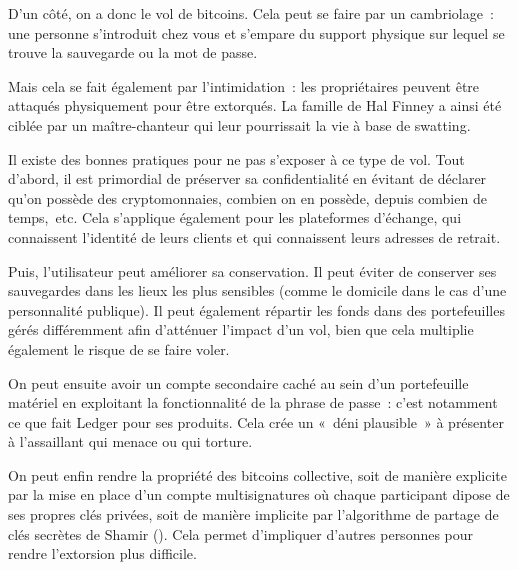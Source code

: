 D'un côté, on a donc le vol de bitcoins. Cela peut se faire par un cambriolage~: une personne s'introduit chez vous et s'empare du support physique sur lequel se trouve la sauvegarde ou la mot de passe.

Mais cela se fait également par l'intimidation~: les propriétaires peuvent être attaqués physiquement pour être extorqués. La famille de Hal Finney a ainsi été ciblée par un maître-chanteur qui leur pourrissait la vie à base de swatting.

Il existe des bonnes pratiques pour ne pas s'exposer à ce type de vol. Tout d'abord, il est primordial de préserver sa confidentialité en évitant de déclarer qu'on possède des cryptomonnaies, combien on en possède, depuis combien de temps,~etc. Cela s'applique également pour les plateformes d'échange, qui connaissent l'identité de leurs clients et qui connaissent leurs adresses de retrait.

Puis, l'utilisateur peut améliorer sa conservation. Il peut éviter de conserver ses sauvegardes dans les lieux les plus sensibles (comme le domicile dans le cas d'une personnalité publique). Il peut également répartir les fonds dans des portefeuilles gérés différemment afin d'atténuer l'impact d'un vol, bien que cela multiplie également le risque de se faire voler.

On peut ensuite avoir un compte secondaire caché au sein d'un portefeuille matériel en exploitant la fonctionnalité de la phrase de passe~: c'est notamment ce que fait Ledger pour ses produits. Cela crée un «~déni plausible~» à présenter à l'assaillant qui menace ou qui torture.

On peut enfin rendre la propriété des bitcoins collective, soit de manière explicite par la mise en place d'un compte multisignatures où chaque participant dipose de ses propres clés privées, soit de manière implicite par l'algorithme de partage de clés secrètes de Shamir (). Cela permet d'impliquer d'autres personnes pour rendre l'extorsion plus difficile. 

